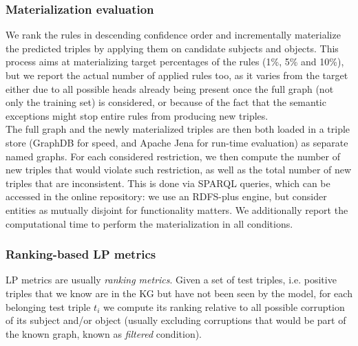 \documentclass[a4paper,UKenglish,cleveref, autoref, thm-restate]{tgdk-v2021}
\begin{document}
\subsubsection{Materialization evaluation} We rank the rules in descending confidence order and incrementally materialize the predicted triples by applying them on candidate subjects and objects. This process aims at materializing target percentages of the rules (1\%, 5\% and 10\%), but we report the actual number of applied rules too, as it varies from the target either due to all possible heads already being present once the full graph (not only the training set) is considered, or because of the fact that the semantic exceptions might stop entire rules from producing new triples.\\
\indent The full graph and the newly materialized triples are then both loaded in a triple store (GraphDB \cite{ontotext_graphdb_2024} for speed, and Apache Jena \cite{apache_software_foundation_apache_2024} for run-time evaluation) as separate named graphs. 
For each considered restriction, we then compute the number of new triples that would violate such restriction, as well as the total number of new triples that are inconsistent. This is done via SPARQL queries, which can be accessed in the online repository: we use an RDFS-plus engine, but consider entities as mutually disjoint for functionality matters. We additionally report the computational time to perform the materialization in all conditions.

\subsubsection{Ranking-based LP metrics}
LP metrics are usually \textit{ranking metrics}. Given a set of test triples, i.e. positive triples that we know are in the KG but have not been seen by the model, for each belonging test triple $t_i$ we compute its ranking relative to all possible corruption of its subject and/or object (usually excluding corruptions that would be part of the known graph, known as \textit{filtered} condition).
\end{document}
